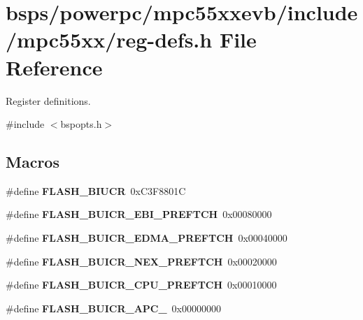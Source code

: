 \hypertarget{reg-defs_8h}{}\section{bsps/powerpc/mpc55xxevb/include/mpc55xx/reg-\/defs.h File Reference}
\label{reg-defs_8h}


Register definitions.  


{\ttfamily \#include $<$bspopts.\+h$>$}\newline
\subsection*{Macros}
\begin{DoxyCompactItemize}
\item 
\mbox{\label{reg-defs_8h_aaeb030a432c1ae410020aba073b94f83}} 
\#define {\bfseries F\+L\+A\+S\+H\+\_\+\+B\+I\+U\+CR}~0x\+C3\+F8801C
\item 
\mbox{\label{reg-defs_8h_a982831c7f8bea24c0446d000f57a8efb}} 
\#define {\bfseries F\+L\+A\+S\+H\+\_\+\+B\+U\+I\+C\+R\+\_\+\+E\+B\+I\+\_\+\+P\+R\+E\+F\+T\+CH}~0x00080000
\item 
\mbox{\label{reg-defs_8h_af77ab80945926bbd5e6564376bf470eb}} 
\#define {\bfseries F\+L\+A\+S\+H\+\_\+\+B\+U\+I\+C\+R\+\_\+\+E\+D\+M\+A\+\_\+\+P\+R\+E\+F\+T\+CH}~0x00040000
\item 
\mbox{\label{reg-defs_8h_a7bc7cdd52b2f0c27747477faa5c2295a}} 
\#define {\bfseries F\+L\+A\+S\+H\+\_\+\+B\+U\+I\+C\+R\+\_\+\+N\+E\+X\+\_\+\+P\+R\+E\+F\+T\+CH}~0x00020000
\item 
\mbox{\label{reg-defs_8h_a4c593bb5ae11ee4c6ce50fd24db5e33d}} 
\#define {\bfseries F\+L\+A\+S\+H\+\_\+\+B\+U\+I\+C\+R\+\_\+\+C\+P\+U\+\_\+\+P\+R\+E\+F\+T\+CH}~0x00010000
\item 
\mbox{\label{reg-defs_8h_a5c90a7aeb724cfc8bdad358cbaf37934}} 
\#define {\bfseries F\+L\+A\+S\+H\+\_\+\+B\+U\+I\+C\+R\+\_\+\+A\+P\+C\+\_}~0x00000000
\item 
\mbox{\label{reg-defs_8h_af16bb66885303a25d89301e0759b1789}} 

\end{DoxyCompactItemize}

